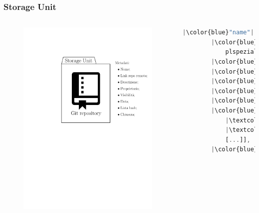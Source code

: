 \documentclass{beamer}
\begin{document}
\begin{frame}[fragile]
	\frametitle{Storage Unit}
	\begin{columns}
		\centering
		\begin{figure}
			\includegraphics[width=\textwidth]{figures/repo.pdf}
		\end{figure}
		\vspace{0.9cm}
		\centering
		\begin{lstlisting}[language=JavaScript, numbers=none]
		|\color{blue}"name"|: "sample",
		|\color{blue}"remote"|: "github.com/
			plspeziali/sample",
		|\color{blue}"description"|: "example",
		|\color{blue}"visibility"|: "public",
		|\color{blue}"date"|: "2021-08-18",
		|\color{blue}"owner"|: "0xCF2[...]66",
		|\color{blue}"hash"|: "3837e[...]53",
		|\color{blue}"filelist"|: [
			|\textcolor{cyan}{"b/astar.js:e09[...]9b6"}|,
			|\textcolor{cyan}{"c/graph.js:539[...]1cc"}|,
			[...]],
		|\color{blue}"closed"|: false
		\end{lstlisting}
	\end{columns}
\end{frame}
\end{document}
